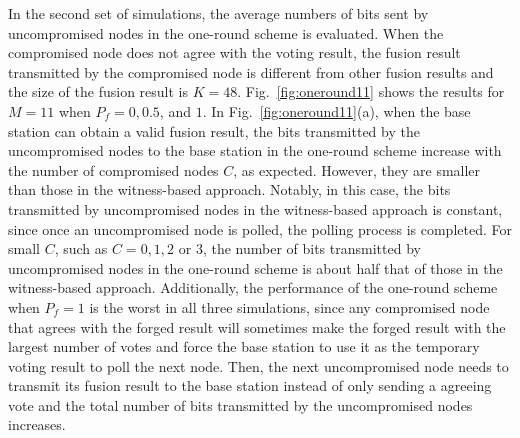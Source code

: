 \documentclass[12pt, onecolumn, draftcls]{IEEEtran}
\begin{document}
\begin{table}
\centering
\renewcommand{\arraystretch}{1.3}
\caption{Maximum average overheads (bits) for variant-round (VR)
scheme and witness-based approach given
in~{\protect\cite{du:assurance}}} \centering
{} \label{tbl:max_overhead_vr}
\end{table}

In the second set of simulations, the average numbers of bits sent
by uncompromised nodes in the one-round scheme is evaluated. When
the compromised node does not agree with the voting result, the
fusion result transmitted by the compromised node is different from
other fusion results and the size of the fusion result is $K=48$.
Fig.~\ref{fig:oneround11} shows the results for $M=11$ when $P_f=0,
0.5$, and $1$. In Fig.~\ref{fig:oneround11}(a), when the base
station can obtain a valid fusion result, the bits transmitted by
the uncompromised nodes to the base station in the one-round scheme
increase with the number of compromised nodes $C$, as expected.
However, they are smaller than those in the witness-based approach.
Notably, in this case, the bits transmitted by uncompromised nodes
in the witness-based approach is constant, since once an
uncompromised node is polled, the polling process is completed. For
small $C$, such as $C=0,1,2$ or $3$, the number of bits transmitted
by uncompromised nodes in the one-round scheme is about half that of
those in the witness-based approach. Additionally, the performance
of the one-round scheme when $P_f=1$ is the worst in all three
simulations, since any compromised node that agrees with the forged
result will sometimes make the forged result with the largest number
of votes and force the base station to use it as the temporary
voting result to poll the next node. Then, the next uncompromised
node needs to transmit its fusion result to the base station instead
of only sending a agreeing vote and the total number of bits
transmitted by the uncompromised nodes increases.
\end{document}
